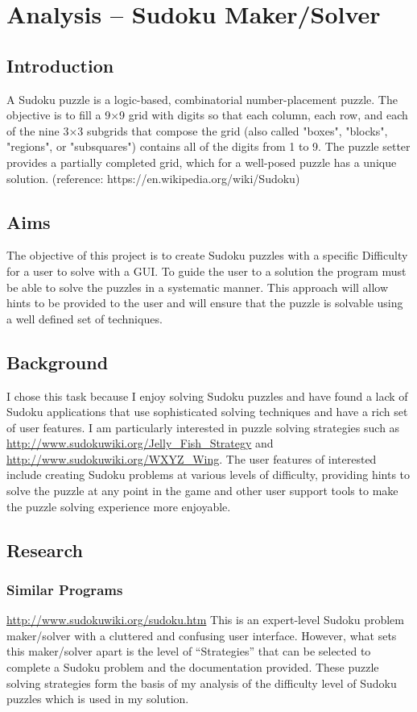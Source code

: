 \documentclass[fleqn]{article}
\begin{document}
\section{Analysis – Sudoku Maker/Solver}

\subsection{Introduction}

 A Sudoku puzzle is a logic-based, combinatorial number-placement puzzle. The objective is to fill a 9×9 grid with digits so that each column, each row, and each of the nine 3×3 subgrids that compose the grid (also called "boxes", "blocks", "regions", or "subsquares") contains all of the digits from 1 to 9. The puzzle setter provides a partially completed grid, which for a well-posed puzzle has a unique solution. (reference: https://en.wikipedia.org/wiki/Sudoku)


\subsection{Aims}
The objective of this project is to create Sudoku puzzles with a specific Difficulty for a user to solve with a GUI. To guide the user to a solution the program must be able to solve the puzzles in a systematic manner. This approach will allow hints to be provided to the user and will ensure that the puzzle is solvable using a well defined set of techniques.

\subsection{Background}
I chose this task because I enjoy solving Sudoku puzzles and have found a lack of Sudoku applications that use sophisticated solving techniques and have a rich set of user features. I am particularly interested in puzzle solving strategies such as \url{http://www.sudokuwiki.org/Jelly_Fish_Strategy} and \url{http://www.sudokuwiki.org/WXYZ_Wing}. The user features of interested include creating Sudoku problems at various levels of difficulty, providing hints to solve the puzzle at any point in the game and other user support tools to make the puzzle solving experience more enjoyable.

\subsection{Research}
\subsubsection{Similar Programs}
\url{http://www.sudokuwiki.org/sudoku.htm}
This is an expert-level Sudoku problem maker/solver with a cluttered and confusing user interface. However, what sets this maker/solver apart is the level of “Strategies” that can be selected to complete a Sudoku problem and the documentation provided. These puzzle solving strategies form the basis of my analysis of the difficulty level of Sudoku puzzles which is used in my solution.
\end{document}
